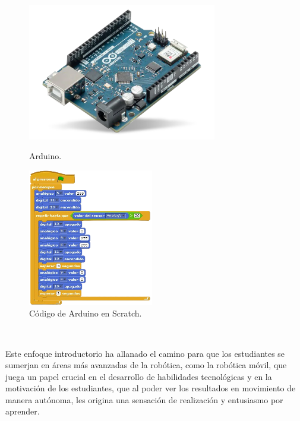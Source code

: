 \begin{figure}[h!]
  \centering
  \begin{minipage}{0.45\textwidth}
    \centering
    \includegraphics[height=6cm]{figs/arduino}
    \caption{Arduino.}
    \label{fig:arduino}
  \end{minipage}
  \hfill
  \begin{minipage}{0.45\textwidth}
    \centering
    \includegraphics[height=6cm]{figs/scratch_arduino_code}
    \caption{Código de Arduino en Scratch.}
    \label{fig:scratch}
  \end{minipage}
\end{figure}\

Este enfoque introductorio ha allanado el camino para que los estudiantes se
sumerjan en áreas más avanzadas de la robótica, como la robótica móvil, que
juega un papel crucial en el desarrollo de habilidades tecnológicas y en la
motivación de los estudiantes, que al poder ver los resultados en movimiento de
manera autónoma, les origina una sensación de realización y entusiasmo por
aprender.

